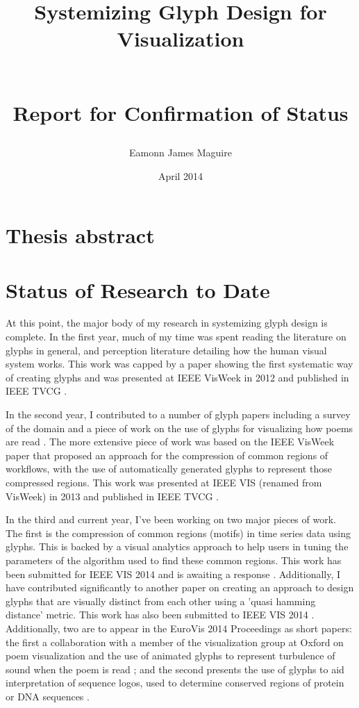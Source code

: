 \documentclass[a4paper]{article}
\title{\begin{onehalfspace}{\Huge Systemizing Glyph Design for Visualization}\end{onehalfspace}~\\ Report for Confirmation of Status}
\author{Eamonn James Maguire}
\date{April 2014}
\begin{document}
\maketitle\thispagestyle{empty}\clearpage\setcounter{page}{1}

\section*{Thesis abstract}
\newcommand{\ThesisAbstractDef}{[abstract]}
\newcommand{\ThesisAbstract}[1]{\renewcommand{\ThesisAbstractDef}{#1}}
\newcommand{\Abstract}{\ThesisAbstractDef}
\newcommand{\NOTETOSELFLONG}[1]{{\color{red}#1}}


\clearpage

\section*{Status of Research to Date}
At this point, the major body of my research in systemizing glyph design is complete. In the first year, much of my time was spent reading the literature on glyphs in general, and perception literature detailing how the human visual system works. This work was capped by a paper showing the first systematic way of creating glyphs and was presented at IEEE VisWeek in 2012 and published in IEEE TVCG \cite{Maguire:2012:TVCG}. 

In the second year, I contributed to a number of glyph papers including a survey of the domain \cite{Borgo:2013:EG} and a piece of work on the use of glyphs for visualizing how poems are read \cite{CGF:Abd2013a}. The more extensive piece of work was based on the IEEE VisWeek \cite{Maguire:2012:TVCG} paper that proposed an approach for the compression of common regions of workflows, with the use of automatically generated glyphs to represent those compressed regions. This work was presented at IEEE VIS (renamed from VisWeek) in 2013 and published in IEEE TVCG \cite{maguire13}. 

In the third and current year, I've been working on two major pieces of work. The first is the compression of common regions (motifs) in time series data using glyphs. This is backed by a visual analytics approach to help users in tuning the parameters of the algorithm used to find these common regions. This work has been submitted for IEEE VIS 2014 and is awaiting a response \cite{maguire14}. Additionally, I have contributed significantly to another paper on creating an approach to design glyphs that are visually distinct from each other using a 'quasi hamming distance' metric. This work has also been submitted to IEEE VIS 2014 \cite{legg14}. Additionally, two are to appear in the EuroVis 2014 Proceedings as short papers: the first a collaboration with a member of the visualization group at Oxford on poem visualization and the use of animated glyphs to represent turbulence of sound when the poem is read \cite{CGF:abdul-rahman14-sp}; and the second presents the use of glyphs to aid interpretation of sequence logos, used to determine conserved regions of protein or DNA sequences \cite{CGF:maguire14-sp}.
\end{document}
